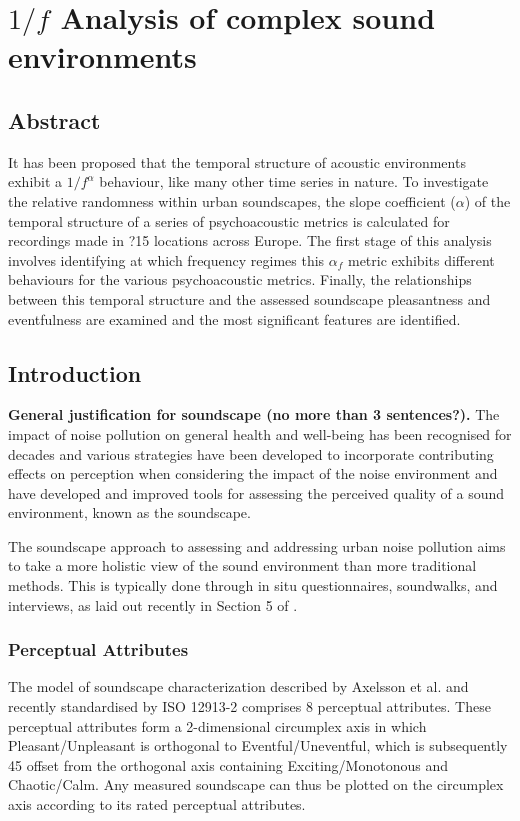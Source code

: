 \chapter{$1/f$ Analysis of complex sound environments}
\label{app:overf}


\section{Abstract}

It has been proposed that the temporal structure of acoustic environments exhibit a $1/f^\alpha$ behaviour, like many other time series in nature. To investigate the relative randomness within urban soundscapes, the slope coefficient ($\alpha$) of the temporal structure of a series of psychoacoustic metrics is calculated for recordings made in ?15 locations across Europe. The first stage of this analysis involves identifying at which frequency regimes this $\alpha_{f}$ metric exhibits different behaviours for the various psychoacoustic metrics. Finally, the relationships between this temporal structure and the assessed soundscape pleasantness and eventfulness are examined and the most significant features are identified.

\section{Introduction}

\textbf{General justification for soundscape (no more than 3 sentences?).}
The impact of noise pollution on general health and well-being has been recognised for decades and various strategies have been developed to incorporate contributing effects on perception when considering the impact of the noise environment and have developed and improved tools for assessing the perceived quality of a sound environment, known as the soundscape.

The soundscape approach to assessing and addressing urban noise pollution aims to take a more holistic view of the sound environment than more traditional methods. This is typically done through in situ questionnaires, soundwalks, and interviews, as laid out recently in Section 5 of \citet{ISO12913Part2}.

\subsection{Perceptual Attributes}
The model of soundscape characterization described by Axelsson et al. \cite{Axelsson2010principal} and recently standardised by ISO 12913-2 \citep{ISO12913Part2} comprises 8 perceptual attributes. These perceptual attributes form a 2-dimensional circumplex axis in which Pleasant/Unpleasant is orthogonal to Eventful/Uneventful, which is subsequently 45\degree{} offset from the orthogonal axis containing Exciting/Monotonous
and Chaotic/Calm. Any measured soundscape can thus be plotted on the circumplex axis according to its rated perceptual attributes.

